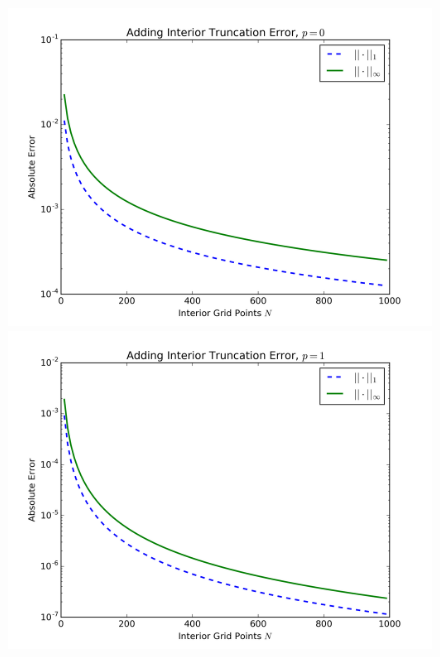 \documentclass{article} %
\theoremstyle{plain}
\numberwithin{equation}{section} %
\numberwithin{figure}{section} %
\numberwithin{table}{section} %
\begin{document}
\begin{enumerate}[\ \ (a)]
\begin{figure}[ht!]
            \begin{minipage}[b]{0.5\linewidth}
                \centering
                \includegraphics[width=\linewidth]{figure_2c1_int_p=0.png}
                \vspace{4ex}
            \end{minipage} 
            \begin{minipage}[b]{0.5\linewidth}
                \centering
                \includegraphics[width=\linewidth]{figure_2c1_int_p=1.png} 
                \vspace{4ex}
            \end{minipage}%
            \begin{minipage}[b]{0.5\linewidth}

\end{minipage}
\end{figure}
\end{enumerate}
\end{document}
